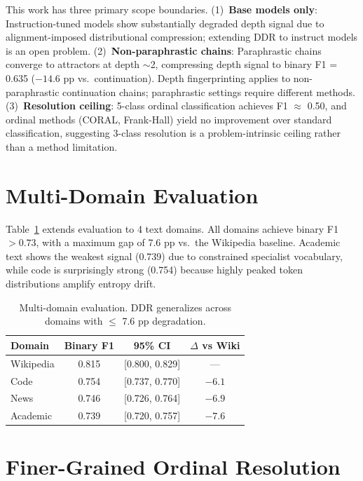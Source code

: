 \documentclass[11pt]{article}
\begin{document}
This work has three primary scope boundaries. (1)~\textbf{Base models only}: Instruction-tuned models show substantially degraded depth signal due to alignment-imposed distributional compression; extending DDR to instruct models is an open problem. (2)~\textbf{Non-paraphrastic chains}: Paraphrastic chains converge to attractors at depth $\sim$2, compressing depth signal to binary F1 = 0.635 ($-14.6$ pp vs.\ continuation). Depth fingerprinting applies to non-paraphrastic continuation chains; paraphrastic settings require different methods. (3)~\textbf{Resolution ceiling}: 5-class ordinal classification achieves F1 $\approx$ 0.50, and ordinal methods (CORAL, Frank-Hall) yield no improvement over standard classification, suggesting 3-class resolution is a problem-intrinsic ceiling rather than a method limitation.

\appendix

\section{Multi-Domain Evaluation}
\label{app:domain}

Table~\ref{tab:domain} extends evaluation to 4 text domains. All domains achieve binary F1 $> 0.73$, with a maximum gap of 7.6 pp vs.\ the Wikipedia baseline. Academic text shows the weakest signal (0.739) due to constrained specialist vocabulary, while code is surprisingly strong (0.754) because highly peaked token distributions amplify entropy drift.

\begin{table}[h]
\centering
\small
\begin{tabular}{lccc}
\toprule
\textbf{Domain} & \textbf{Binary F1} & \textbf{95\% CI} & \textbf{$\Delta$ vs Wiki} \\
\midrule
Wikipedia & 0.815 & [0.800, 0.829] & --- \\
Code & 0.754 & [0.737, 0.770] & $-6.1$ \\
News & 0.746 & [0.726, 0.764] & $-6.9$ \\
Academic & 0.739 & [0.720, 0.757] & $-7.6$ \\
\bottomrule
\end{tabular}
\caption{Multi-domain evaluation. DDR generalizes across domains with $\leq$ 7.6 pp degradation.}
\label{tab:domain}
\end{table}

\section{Finer-Grained Ordinal Resolution}
\label{app:ordinal}
\end{document}
